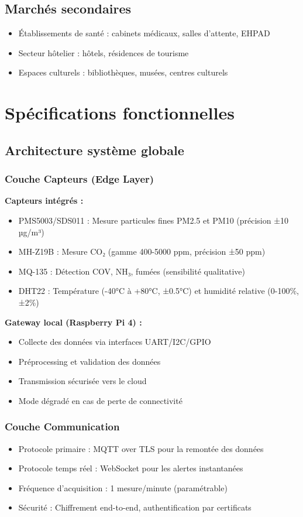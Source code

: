 \documentclass[12pt,a4paper]{article}
\begin{document}
\subsection{Marchés secondaires}
\begin{itemize}
    \item Établissements de santé : cabinets médicaux, salles d'attente, EHPAD
    \item Secteur hôtelier : hôtels, résidences de tourisme
    \item Espaces culturels : bibliothèques, musées, centres culturels
\end{itemize}

\section{Spécifications fonctionnelles}
\subsection{Architecture système globale}
\subsubsection{Couche Capteurs (Edge Layer)}
\textbf{Capteurs intégrés :}
\begin{itemize}
    \item PMS5003/SDS011 : Mesure particules fines PM2.5 et PM10 (précision ±10 µg/m³)
    \item MH-Z19B : Mesure CO₂ (gamme 400-5000 ppm, précision ±50 ppm)
    \item MQ-135 : Détection COV, NH₃, fumées (sensibilité qualitative)
    \item DHT22 : Température (-40°C à +80°C, ±0.5°C) et humidité relative (0-100\%, ±2\%)
\end{itemize}

\textbf{Gateway local (Raspberry Pi 4) :}
\begin{itemize}
    \item Collecte des données via interfaces UART/I2C/GPIO
    \item Préprocessing et validation des données
    \item Transmission sécurisée vers le cloud
    \item Mode dégradé en cas de perte de connectivité
\end{itemize}

\subsubsection{Couche Communication}
\begin{itemize}
    \item Protocole primaire : MQTT over TLS pour la remontée des données
    \item Protocole temps réel : WebSocket pour les alertes instantanées
    \item Fréquence d'acquisition : 1 mesure/minute (paramétrable)
    \item Sécurité : Chiffrement end-to-end, authentification par certificats
\end{itemize}
\end{document}
